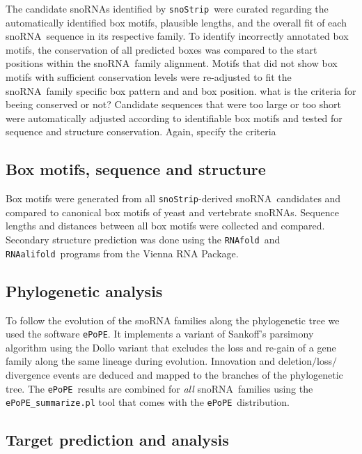 \documentclass[preprint,3p,times,twocolumn]{elsarticle}
\newcommand{\JH}[1]{\begingroup\color{purple}#1\endgroup}
\newcommand{\TODO}[1] {\begingroup\color{red}#1\endgroup}
\newcommand{\sno}{snoRNA}
\newcommand{\snostrip}{\texttt{snoStrip}}
\newcommand{\epope}{\texttt{ePoPE}}
\newcommand{\fold}{\texttt{RNAfold}}
\newcommand{\alifold}{\texttt{RNAalifold}}
\begin{document}
The candidate snoRNAs identified by \snostrip\ were curated regarding the
automatically identified box motifs, plausible lengths, and the overall fit
of each \sno\ sequence in its respective family.  To identify incorrectly
annotated box motifs, the conservation of all predicted boxes was compared
to the start positions within the \sno\ family alignment. Motifs that did
not show box motifs with sufficient conservation levels were re-adjusted to
fit the \sno\ family specific box pattern and and box position.  \JH{what
  is the criteria for beeing conserved or not?}
Candidate sequences that were too large or too short were automatically
adjusted according to identifiable box motifs and tested for sequence and
structure conservation.
\TODO{Again, specify the criteria} 

\subsection{Box motifs, sequence and structure}

Box motifs were generated from all \snostrip-derived \sno\ candidates
and compared to canonical box motifs of yeast and vertebrate snoRNAs.
Sequence lengths and distances between all box motifs were collected
and compared. Secondary structure prediction was done using the \fold\
and \alifold\ programs from the Vienna RNA
Package\cite{Hofacker:1994}.

\subsection{Phylogenetic analysis}

To follow the evolution of the snoRNA families along the phylogenetic
tree we used the software \epope\cite{Hertel:2015}.  It implements a
variant of Sankoff’s parsimony algorithm using the Dollo variant that
excludes the loss and re-gain of a gene family along the same lineage
during evolution.  Innovation and deletion$/$loss$/$divergence events
are deduced and mapped to the branches of the phylogenetic tree.  The
\epope\ results are combined for \emph{all} \sno\ families using the
\texttt{ePoPE\_summarize.pl} tool that comes with the \epope\
distribution.

\subsection{Target prediction and analysis}
\end{document}

